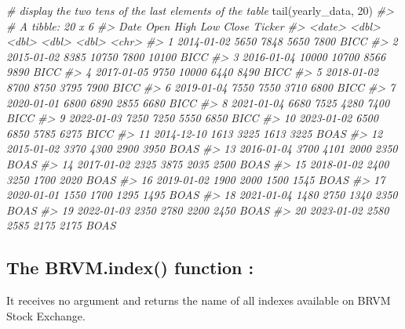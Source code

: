 \documentclass[
]{article}
\newenvironment{Shaded}{\begin{snugshade}}{\end{snugshade}}
\newcommand{\CommentTok}[1]{\textcolor[rgb]{0.56,0.35,0.01}{\textit{#1}}}
\newcommand{\DecValTok}[1]{\textcolor[rgb]{0.00,0.00,0.81}{#1}}
\newcommand{\FunctionTok}[1]{\textcolor[rgb]{0.00,0.00,0.00}{#1}}
\newcommand{\NormalTok}[1]{#1}
\begin{document}
\begin{Shaded}
\begin{Highlighting}[]
\CommentTok{\# display the two tens of the last elements of the table}
\FunctionTok{tail}\NormalTok{(yearly\_data, }\DecValTok{20}\NormalTok{) }
\CommentTok{\#\textgreater{} \# A tibble: 20 x 6}
\CommentTok{\#\textgreater{}    Date        Open  High   Low Close Ticker}
\CommentTok{\#\textgreater{}    \textless{}date\textgreater{}     \textless{}dbl\textgreater{} \textless{}dbl\textgreater{} \textless{}dbl\textgreater{} \textless{}dbl\textgreater{} \textless{}chr\textgreater{} }
\CommentTok{\#\textgreater{}  1 2014{-}01{-}02  5650  7848  5650  7800 BICC  }
\CommentTok{\#\textgreater{}  2 2015{-}01{-}02  8385 10750  7800 10100 BICC  }
\CommentTok{\#\textgreater{}  3 2016{-}01{-}04 10000 10700  8566  9890 BICC  }
\CommentTok{\#\textgreater{}  4 2017{-}01{-}05  9750 10000  6440  8490 BICC  }
\CommentTok{\#\textgreater{}  5 2018{-}01{-}02  8700  8750  3795  7900 BICC  }
\CommentTok{\#\textgreater{}  6 2019{-}01{-}04  7550  7550  3710  6800 BICC  }
\CommentTok{\#\textgreater{}  7 2020{-}01{-}01  6800  6890  2855  6680 BICC  }
\CommentTok{\#\textgreater{}  8 2021{-}01{-}04  6680  7525  4280  7400 BICC  }
\CommentTok{\#\textgreater{}  9 2022{-}01{-}03  7250  7250  5550  6850 BICC  }
\CommentTok{\#\textgreater{} 10 2023{-}01{-}02  6500  6850  5785  6275 BICC  }
\CommentTok{\#\textgreater{} 11 2014{-}12{-}10  1613  3225  1613  3225 BOAS  }
\CommentTok{\#\textgreater{} 12 2015{-}01{-}02  3370  4300  2900  3950 BOAS  }
\CommentTok{\#\textgreater{} 13 2016{-}01{-}04  3700  4101  2000  2350 BOAS  }
\CommentTok{\#\textgreater{} 14 2017{-}01{-}02  2325  3875  2035  2500 BOAS  }
\CommentTok{\#\textgreater{} 15 2018{-}01{-}02  2400  3250  1700  2020 BOAS  }
\CommentTok{\#\textgreater{} 16 2019{-}01{-}02  1900  2000  1500  1545 BOAS  }
\CommentTok{\#\textgreater{} 17 2020{-}01{-}01  1550  1700  1295  1495 BOAS  }
\CommentTok{\#\textgreater{} 18 2021{-}01{-}04  1480  2750  1340  2350 BOAS  }
\CommentTok{\#\textgreater{} 19 2022{-}01{-}03  2350  2780  2200  2450 BOAS  }
\CommentTok{\#\textgreater{} 20 2023{-}01{-}02  2580  2585  2175  2175 BOAS}
\end{Highlighting}
\end{Shaded}

\hypertarget{the-brvm.index-function}{%
\subsection{\texorpdfstring{The \textbf{BRVM.index()} function
:}{The BRVM.index() function :}}\label{the-brvm.index-function}}

It receives no argument and returns the name of all indexes available on
BRVM Stock Exchange.
\end{document}
